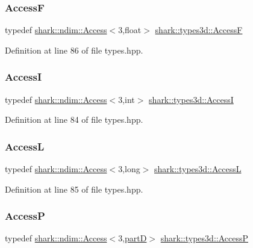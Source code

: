 \subsubsection{\texorpdfstring{AccessF}{AccessF}}
{\footnotesize\ttfamily typedef \hyperlink{classshark_1_1ndim_1_1_access}{shark\+::ndim\+::\+Access}$<$3,float$>$ \hyperlink{namespaceshark_1_1types3d_a3c9bf12e0ef0af2d09be323b967710fe}{shark\+::types3d\+::\+AccessF}}



Definition at line 86 of file types.\+hpp.

\hypertarget{namespaceshark_1_1types3d_ae71f2ec0e62d8216cfd724df50682326}{}\label{namespaceshark_1_1types3d_ae71f2ec0e62d8216cfd724df50682326} 
\subsubsection{\texorpdfstring{AccessI}{AccessI}}
{\footnotesize\ttfamily typedef \hyperlink{classshark_1_1ndim_1_1_access}{shark\+::ndim\+::\+Access}$<$3,int$>$ \hyperlink{namespaceshark_1_1types3d_ae71f2ec0e62d8216cfd724df50682326}{shark\+::types3d\+::\+AccessI}}



Definition at line 84 of file types.\+hpp.

\hypertarget{namespaceshark_1_1types3d_ab888022609e08413bb84503cfeb3d205}{}\label{namespaceshark_1_1types3d_ab888022609e08413bb84503cfeb3d205} 
\subsubsection{\texorpdfstring{AccessL}{AccessL}}
{\footnotesize\ttfamily typedef \hyperlink{classshark_1_1ndim_1_1_access}{shark\+::ndim\+::\+Access}$<$3,long$>$ \hyperlink{namespaceshark_1_1types3d_ab888022609e08413bb84503cfeb3d205}{shark\+::types3d\+::\+AccessL}}



Definition at line 85 of file types.\+hpp.

\hypertarget{namespaceshark_1_1types3d_a38a0a0a9d26919043ef652cb281ee952}{}\label{namespaceshark_1_1types3d_a38a0a0a9d26919043ef652cb281ee952} 
\subsubsection{\texorpdfstring{AccessP}{AccessP}}
{\footnotesize\ttfamily typedef \hyperlink{classshark_1_1ndim_1_1_access}{shark\+::ndim\+::\+Access}$<$3,\hyperlink{namespaceshark_1_1types3d_a8ba1ca83346f7674ce78342d0dc516ce}{partD}$>$ \hyperlink{namespaceshark_1_1types3d_a38a0a0a9d26919043ef652cb281ee952}{shark\+::types3d\+::\+AccessP}}



